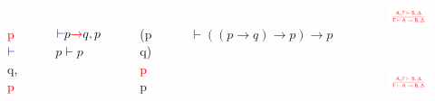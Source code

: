 \documentclass{beamer}
\begin{document}
\begin{frame}
\begin{columns}
          \bigskip
          \\\textcolor{red}{p} $\textcolor{blue}{\vdash}$ q, \textcolor{red}{p}\\
          \\\noindent\rule{1.5cm}{0.4pt}\\
         $\textcolor{blue}{\vdash} p
         \textcolor{red}{\rightarrow} q, p$
         \hspace{0.7cm} $p \vdash p$
         \\\noindent\rule{3cm}{0.4pt}\\
          \hspace{3mm} (p \rightarrow q) \textcolor{red}{\rightarrow p}  \textcolor{blue}{\vdash} p\\
          \noindent\rule{4cm}{0.4pt}
          \\\hspace{3mm}$\vdash ((p \rightarrow q) \rightarrow p) \rightarrow p$
        \begin{figure}[!tbp]
          \raggedleft
          \begin{minipage}[b]{\textwidth}
          \includegraphics[width=\textwidth]{rule1.png}
          \end{minipage}\\
          \begin{minipage}[b]{\textwidth}
          \includegraphics[width=\textwidth]{rule1.png}

\end{minipage}
\end{figure}
\end{columns}
\end{frame}
\end{document}
